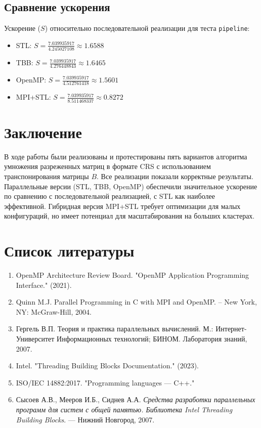 \documentclass[a4paper,12pt]{article}
\begin{document}
\subsection{Сравнение ускорения}
Ускорение (\( S \)) относительно последовательной реализации для теста \texttt{pipeline}:
\begin{itemize}
    \item STL: \( S = \frac{7.039935917}{4.245027108} \approx 1.6588 \)
    \item TBB: \( S = \frac{7.039935917}{4.276448843} \approx 1.6465 \)
    \item OpenMP: \( S = \frac{7.039935917}{4.512761418} \approx 1.5601 \)
    \item MPI+STL: \( S = \frac{7.039935917}{8.511468337} \approx 0.8272 \)
\end{itemize}

\section{Заключение}
В ходе работы были реализованы и протестированы пять вариантов алгоритма умножения разреженных матриц в формате CRS с использованием транспонирования матрицы \( B \). Все реализации показали корректные результаты. Параллельные версии (STL, TBB, OpenMP) обеспечили значительное ускорение по сравнению с последовательной реализацией, с STL как наиболее эффективной. Гибридная версия MPI+STL требует оптимизации для малых конфигураций, но имеет потенциал для масштабирования на больших кластерах.

\section{Список литературы}
\begin{enumerate}
    \item OpenMP Architecture Review Board. "OpenMP Application Programming Interface." (2021).
    \item Quinn M.J. Parallel Programming in C with MPI and OpenMP. – New York, NY: McGraw-Hill, 2004.
    \item Гергель В.П. Теория и практика параллельных вычислений. М.: Интернет-Университет Информационных технологий; БИНОМ. Лаборатория знаний, 2007.
    \item Intel. "Threading Building Blocks Documentation." (2023).
    \item ISO/IEC 14882:2017. "Programming languages — C++."
    \item Сысоев А.В., Мееров И.Б., Сиднев А.А. \textit{Средства разработки параллельных программ для систем с общей памятью. Библиотека Intel Threading Building Blocks}. — Нижний Новгород, 2007.
\end{enumerate}
\end{document}
